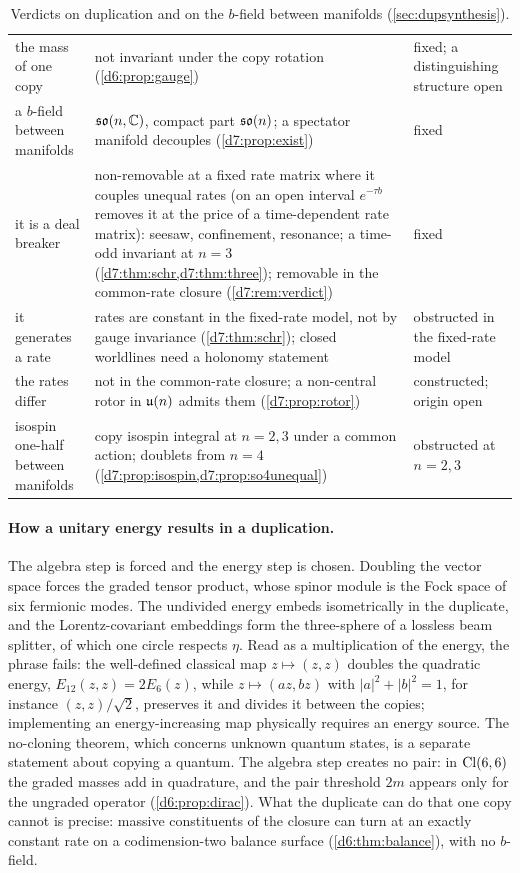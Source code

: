 \begin{table}[t]
\begin{tabular}{@{}>{\raggedright\arraybackslash}p{3.6cm}>{\raggedright\arraybackslash}p{7.4cm}>{\raggedright\arraybackslash}p{3.4cm}@{}}
the mass of one copy & not invariant under the copy rotation (\cref{d6:prop:gauge}) & fixed; a distinguishing structure open\\
a $b$-field between manifolds & $\mathfrak{so}(n,\mathbb{C})$, compact part $\mathfrak{so}(n)$; a spectator manifold decouples (\cref{d7:prop:exist}) & fixed\\
it is a deal breaker & non-removable at a fixed rate matrix where it couples unequal rates (on an open interval $e^{-\tau b}$ removes it at the price of a time-dependent rate matrix): seesaw, confinement, resonance; a time-odd invariant at $n=3$ (\cref{d7:thm:schr,d7:thm:three}); removable in the common-rate closure (\cref{d7:rem:verdict}) & fixed\\
it generates a rate & rates are constant in the fixed-rate model, not by gauge invariance (\cref{d7:thm:schr}); closed worldlines need a holonomy statement & obstructed in the fixed-rate model\\
the rates differ & not in the common-rate closure; a non-central rotor in $\mathfrak{u}(n)$ admits them (\cref{d7:prop:rotor}) & constructed; origin open\\
isospin one-half between manifolds & copy isospin integral at $n=2,3$ under a common action; doublets from $n=4$ (\cref{d7:prop:isospin,d7:prop:so4unequal}) & obstructed at $n=2,3$\\
\bottomrule
\end{tabular}
\caption{Verdicts on duplication and on the $b$-field between manifolds (\cref{sec:dupsynthesis}).}
\label{tab:dupsynthesis}
\end{table}

\paragraph{How a unitary energy results in a duplication.} The algebra step is forced and the energy step is chosen. Doubling the vector space
forces the graded tensor product, whose spinor module is the Fock space of six fermionic modes. The undivided energy embeds isometrically in the
duplicate, and the Lorentz-covariant embeddings form the three-sphere of a lossless beam splitter, of which one circle respects $\eta$. Read as a
multiplication of the energy, the phrase fails: the well-defined classical map $z\mapsto(z,z)$ doubles the quadratic energy,
$E_{12}(z,z)=2E_6(z)$, while $z\mapsto(az,bz)$ with $|a|^2+|b|^2=1$, for instance $(z,z)/\sqrt2$, preserves it and divides it between the copies;
implementing an energy-increasing map physically requires an energy source. The no-cloning theorem, which concerns unknown quantum states, is a
separate statement about copying a quantum. The algebra step creates no pair: in $\mathrm{Cl}(6,6)$ the graded masses add in quadrature, and the pair threshold $2m$ appears
only for the ungraded operator (\cref{d6:prop:dirac}). What the duplicate can do that one copy cannot is precise: massive constituents of the
closure can turn at an exactly constant rate on a codimension-two balance surface (\cref{d6:thm:balance}), with no $b$-field.


